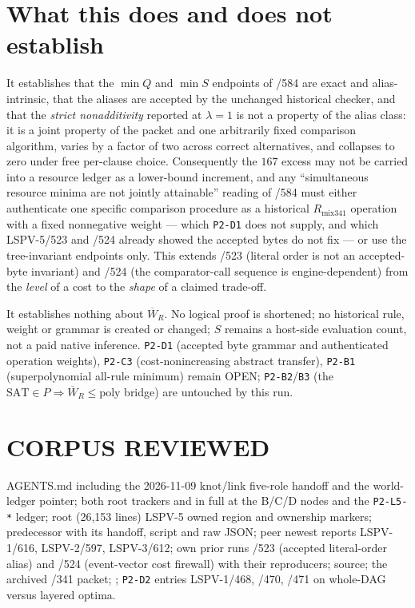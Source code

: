 \documentclass[11pt]{article}
\begin{document}
\section*{What this does and does not establish}
It establishes that the $\min Q$ and $\min S$ endpoints of /584 are exact and alias-intrinsic, that the aliases are accepted by the unchanged historical checker, and that the \emph{strict nonadditivity} reported at $\lambda=1$ is not a property of the alias class: it is a joint property of the packet and one arbitrarily fixed comparison algorithm, varies by a factor of two across correct alternatives, and collapses to zero under free per-clause choice. Consequently the $167$ excess may not be carried into a resource ledger as a lower-bound increment, and any ``simultaneous resource minima are not jointly attainable'' reading of /584 must either authenticate one specific comparison procedure as a historical $R_{\mathrm{mix341}}$ operation with a fixed nonnegative weight --- which \texttt{P2-D1} does not supply, and which LSPV-5/523 and /524 already showed the accepted bytes do not fix --- or use the tree-invariant endpoints only. This extends /523 (literal order is not an accepted-byte invariant) and /524 (the comparator-call sequence is engine-dependent) from the \emph{level} of a cost to the \emph{shape} of a claimed trade-off.

It establishes nothing about $\overline W_R$. No logical proof is shortened; no historical rule, weight or grammar is created or changed; $S$ remains a host-side evaluation count, not a paid native inference. \texttt{P2-D1} (accepted byte grammar and authenticated operation weights), \texttt{P2-C3} (cost-nonincreasing abstract transfer), \texttt{P2-B1} (superpolynomial all-rule minimum) remain OPEN; \texttt{P2-B2}/\texttt{B3} (the $\mathrm{SAT}\in P\Rightarrow\overline W_R\le\mathrm{poly}$ bridge) are untouched by this run.

\section*{CORPUS REVIEWED}
AGENTS.md including the 2026-11-09 knot/link five-role handoff and the world-ledger pointer; both root trackers  and  in full at the B/C/D nodes and the \texttt{P2-L5-*} ledger; root  (26{,}153 lines) LSPV-5 owned region and ownership markers; predecessor  with its handoff, script and raw JSON; peer newest reports LSPV-1/616, LSPV-2/597, LSPV-3/612; own prior runs /523 (accepted literal-order alias) and /524 (event-vector cost firewall) with their reproducers;  source; the archived /341 packet; ; \texttt{P2-D2} entries LSPV-1/468, /470, /471 on whole-DAG versus layered optima.
\end{document}
